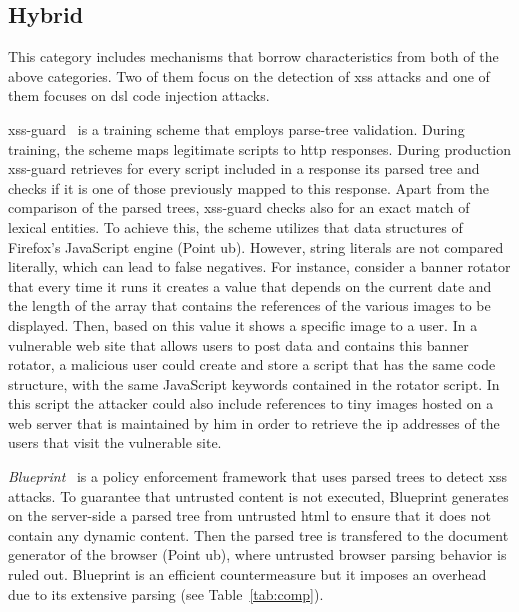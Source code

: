 \documentclass[conference]{IEEEtran}
\begin{document}
\subsection{Hybrid}
\label{sec:hybrid}

This category includes mechanisms that borrow
characteristics from both of the above categories.
Two of them focus on the detection of {\sc xss}
attacks and one of them focuses on {\sc dsl} code
injection attacks.

{\sc xss-guard}~\cite{BV08} is a training scheme that employs
parse-tree validation. During training, the scheme maps legitimate
scripts to {\sc http} responses. During production {\sc xss-guard}
retrieves for every script included in a response its parsed tree and
checks if it is one of those previously mapped to this response. Apart
from the comparison of the parsed trees, {\sc xss-guard} checks also
for an exact match of lexical entities. To achieve this, the scheme
utilizes that data structures of Firefox's JavaScript engine (Point
{\sc ub}). However, string literals are not compared literally, which
can lead to false negatives. For instance, consider a banner rotator
that every time it runs it creates a value that depends on the
current date and the length of the array that contains the references
of the various images to be displayed. Then, based on this value it
shows a specific image to a user. In a vulnerable web site that allows
users to post data and contains this banner rotator, a malicious user
could create and store a script that has the same code structure, with
the same JavaScript keywords contained in the rotator script.
In this script the attacker could also include references to tiny
images hosted on a web server that is maintained by him in order to
retrieve the {\sc ip} addresses of the users that visit the vulnerable
site.

{\it Blueprint}~\cite{LV09} is a policy enforcement framework that
uses parsed trees to detect {\sc xss} attacks. To guarantee
that untrusted content is not executed, Blueprint generates on the
server-side a parsed tree from untrusted {\sc html} to ensure that it
does not contain any dynamic content. Then the parsed tree is
transfered to the document generator of the browser (Point {\sc ub}),
where untrusted browser parsing behavior is ruled out.
Blueprint is an efficient countermeasure but it imposes an
overhead due to its extensive parsing (see Table~\ref{tab:comp}).
\end{document}
